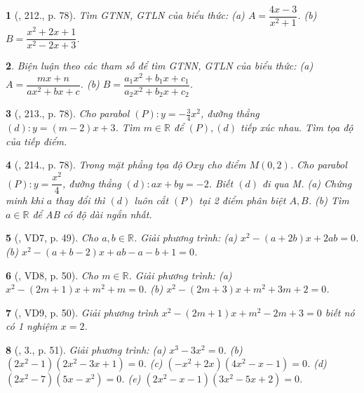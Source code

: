 \documentclass{article}
\newtheorem{baitoan}{}
\begin{document}
\begin{baitoan}[\cite{Tuyen_Toan_9_old}, 212., p. 78]
	Tìm {\rm GTNN, GTLN} của biểu thức: (a) $A = \dfrac{4x - 3}{x^2 + 1}$. (b) $B = \dfrac{x^2 + 2x + 1}{x^2 - 2x + 3}$.
\end{baitoan}

\begin{baitoan}
	Biện luận theo các tham số để tìm {\rm GTNN, GTLN} của biểu thức: (a) $A = \dfrac{mx + n}{ax^2 + bx + c}$. (b) $B = \dfrac{a_1x^2 + b_1x + c_1}{a_2x^2 + b_2x + c_2}$.
\end{baitoan}

\begin{baitoan}[\cite{Tuyen_Toan_9_old}, 213., p. 78]
	Cho parabol $(P):y = -\frac{3}{4}x^2$, đường thẳng $(d):y = (m - 2)x + 3$. Tìm $m\in\mathbb{R}$ để $(P),(d)$ tiếp xúc nhau. Tìm tọa độ của tiếp điểm.
\end{baitoan}

\begin{baitoan}[\cite{Tuyen_Toan_9_old}, 214., p. 78]
	Trong mặt phẳng tọa độ $Oxy$ cho điểm $M(0,2)$. Cho parabol $(P):y = \dfrac{x^2}{4}$, đường thẳng $(d):ax + by = -2$. Biết $(d)$ đi qua M. (a) Chứng minh khi $a$ thay đổi thì $(d)$ luôn cắt $(P)$ tại 2 điểm phân biệt $A,B$. (b) Tìm $a\in\mathbb{R}$ để AB có độ dài ngắn nhất.
\end{baitoan}

\begin{baitoan}[\cite{Thu_Viet_Minh_ptb2}, VD7, p. 49]
	Cho $a,b\in\mathbb{R}$. Giải phương trình: (a) $x^2 - (a + 2b)x + 2ab = 0$. (b) $x^2 - (a + b - 2)x + ab - a - b + 1 = 0$.
\end{baitoan}

\begin{baitoan}[\cite{Thu_Viet_Minh_ptb2}, VD8, p. 50]
	Cho $m\in\mathbb{R}$. Giải phương trình: (a) $x^2 - (2m + 1)x + m^2 + m = 0$. (b) $x^2 - (2m + 3)x + m^2 + 3m + 2 = 0$.
\end{baitoan}

\begin{baitoan}[\cite{Thu_Viet_Minh_ptb2}, VD9, p. 50]
	Giải phương trình $x^2 - (2m + 1)x + m^2 - 2m + 3 = 0$ biết nó có 1 nghiệm $x = 2$.
\end{baitoan}

\begin{baitoan}[\cite{Thu_Viet_Minh_ptb2}, 3., p. 51]
	Giải phương trình: (a) $x^3 - 3x^2 = 0$. (b) $(2x^2 - 1)(2x^2 - 3x + 1) = 0$. (c) $(-x^2 + 2x)(4x^2 - x - 1) = 0$. (d) $(2x^2 - 7)(5x - x^2) = 0$. (e) $(2x^2 - x - 1)(3x^2 - 5x + 2) = 0$.
\end{baitoan}
\end{document}
